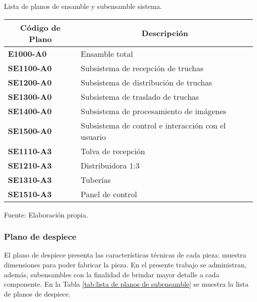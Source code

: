 \begin{mytable}[H]
	\footnotesize\centering
	\caption{Lista de planos de ensamble y subensamble sistema.}
	\label{tab:lista de planos de ensamble y subensamble}
	\begin{tabular}{|l|l|}
		\hline
		\multicolumn{1}{|c|}{\textbf{Código de Plano}} & \multicolumn{1}{c|}{\textbf{Descripción}} \\ \hline
		\textbf{E1000-A0}         & Ensamble total  \\ \hline
		\textbf{SE1100-A0}        & Subsistema de recepción de truchas  \\ \hline
		\textbf{SE1200-A0}        & Subsistema de distribución de truchas \\ \hline
		\textbf{SE1300-A0}        & Subsistema de traslado de truchas \\ \hline
		\textbf{SE1400-A0}        & Subsistema de procesamiento de imágenes \\ \hline
		\textbf{SE1500-A0}        & Subsistema de control e interacción con el usuario\\ \hline
		\textbf{SE1110-A3}        & Tolva de recepción \\ \hline
		\textbf{SE1210-A3}        & Distribuidora 1:3 \\ \hline
		\textbf{SE1310-A3}        & Tuberías \\ \hline 
		\textbf{SE1510-A3}        & Panel de control \\ \hline
	\end{tabular}
	\begin{myflushcenteraftertable}	
		Fuente: Elaboración propia.
	\end{myflushcenteraftertable}
\end{mytable}


\subsubsection{Plano de despiece}

El plano de despiece presenta las características técnicas de cada pieza: muestra dimensiones para poder fabricar la pieza. En el presente trabajo se administran, además, subensambles con la finalidad de brindar mayor detalle a cada componente. En la Tabla \ref{tab:lista de planos de subensamble} se muestra la lista de planos de despiece. 

